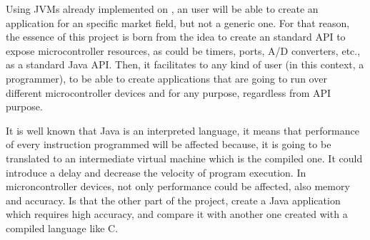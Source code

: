 Using JVMs already implemented on \cite{Art:Darjeeling}, an user will be able to create an application for an specific market field, but not a generic one. For that reason, the essence of this project is born from the idea to create an standard API to expose microcontroller resources, as could be timers, ports, A/D converters, etc., as a standard Java API. Then, it facilitates to any kind of user (in this context, a programmer), to be able to create applications that are going to run over different microcontroller devices and for any purpose, regardless from API purpose.

It is well known that Java is an interpreted language, it means that performance of every instruction programmed will be affected because, it is going to be translated to an intermediate virtual machine which is the compiled one. It could introduce a delay and decrease the velocity of program execution. In microncontroller devices, not only performance could be affected, also memory and accuracy. Is that the other part of the project, create a Java application which requires high accuracy, and compare it with another one created with a compiled language like C.